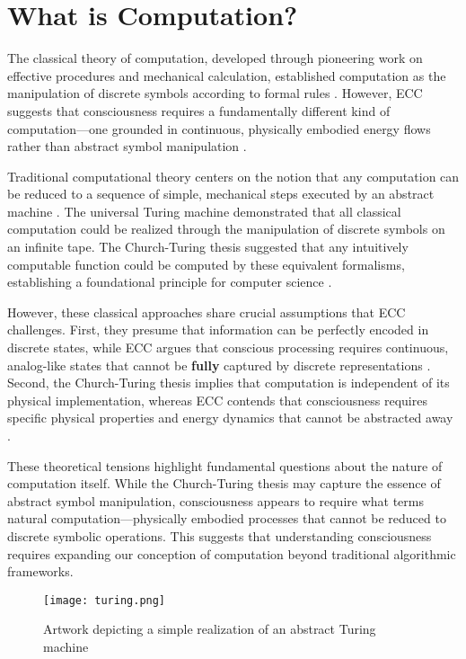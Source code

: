 \section{What is Computation?}

The classical theory of computation, developed through pioneering work on effective procedures and mechanical calculation, established computation as the manipulation of discrete symbols according to formal rules \cite{Turing1936}. However, ECC suggests that consciousness requires a fundamentally different kind of computation—one grounded in continuous, physically embodied energy flows rather than abstract symbol manipulation \cite{MacLennan2004}.

Traditional computational theory centers on the notion that any computation can be reduced to a sequence of simple, mechanical steps executed by an abstract machine \cite{Copeland2017}. The universal Turing machine demonstrated that all classical computation could be realized through the manipulation of discrete symbols on an infinite tape. The Church-Turing thesis suggested that any intuitively computable function could be computed by these equivalent formalisms, establishing a foundational principle for computer science \cite{Smith2002}.

However, these classical approaches share crucial assumptions that ECC challenges. First, they presume that information can be perfectly encoded in discrete states, while ECC argues that conscious processing requires continuous, analog-like states that cannot be \textbf{fully} captured by discrete representations \cite{vanGelder1995}. Second, the Church-Turing thesis implies that computation is independent of its physical implementation, whereas ECC contends that consciousness requires specific physical properties and energy dynamics that cannot be abstracted away \cite{Landauer1996}.

These theoretical tensions highlight fundamental questions about the nature of computation itself. While the Church-Turing thesis may capture the essence of abstract symbol manipulation, consciousness appears to require what \cite{Piccinini2015} terms natural computation—physically embodied processes that cannot be reduced to discrete symbolic operations. This suggests that understanding consciousness requires expanding our conception of computation beyond traditional algorithmic frameworks.

\begin{figure}[h]
    \centering
    \texttt{[image: turing.png]}

    \caption{Artwork depicting a simple realization of an abstract Turing machine}
\end{figure}

